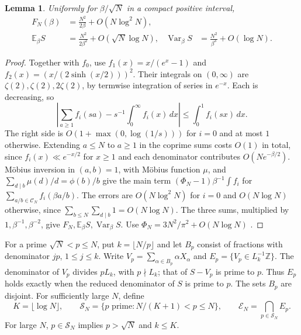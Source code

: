 \documentclass[11pt]{amsart}
\newtheorem{lemma}[theorem]{Lemma}
\theoremstyle{remark}
\DeclareMathOperator{\Var}{Var}
\newcommand{\Ee}{\mathbb E}
\newcommand{\Z}{\mathbb Z}
\newcommand{\CN}{\mathcal C_N}
\begin{document}
\begin{lemma}\label{lem:bulk}
Uniformly for \(\beta/\sqrt N\) in a compact positive interval,
\begin{align*}
 F_N(\beta)&=\frac{N^2}{2\beta}+O(N\log^2 N),\\
 \Ee_\beta S&=\frac{N^2}{2\beta^2}+O(\sqrt N\log N),&
 \Var_\beta S&=\frac{N^2}{\beta^3}+O(\log N).
\end{align*}
\end{lemma}
\begin{proof}
Together with \(f_0\), use \(f_1(x)=x/(e^x-1)\) and
\(f_2(x)=(x/(2\sinh(x/2)))^2\). Their integrals on \((0,\infty)\)
are \(\zeta(2),\zeta(2),2\zeta(2)\), by termwise integration of
series in \(e^{-x}\). Each is decreasing, so
\[
 \left|\sum_{a\ge1} f_i(sa)-s^{-1}\int_0^\infty f_i(x)\,dx\right|
 \le\int_0^1 f_i(sx)\,dx .
\]
The right side is \(O(1+\max(0,\log(1/s)))\) for \(i=0\) and at most
\(1\) otherwise. Extending \(a\le N\) to \(a\ge1\) in the coprime
sums costs \(O(1)\) in total, since \(f_i(x)\ll e^{-x/2}\) for \(x\ge1\)
and each denominator contributes \(O(N e^{-\beta/2})\).
M\"obius inversion in \((a,b)=1\), with M\"obius function \(\mu\), and
\(\sum_{d\mid b}\mu(d)/d=\phi(b)/b\) give the main term
\((\Phi_N-1)\beta^{-1}\int f_i\) for \(\sum_{a/b\in\CN}f_i(\beta a/b)\).
The errors are \(O(N\log^2 N)\) for \(i=0\) and \(O(N\log N)\) otherwise,
since \(\sum_{b\le N}\sum_{d\mid b}1=O(N\log N)\).
The three sums, multiplied by \(1,\beta^{-1},\beta^{-2}\), give
\(F_N,\Ee_\beta S,\Var_\beta S\). Use
\(\Phi_N=3N^2/\pi^2+O(N\log N)\) \cite{hardy-wright}.
\end{proof}

For a prime \(\sqrt N<p\le N\), put \(k=\lfloor N/p\rfloor\) and let
\(B_p\) consist of fractions with denominator \(jp\), \(1\le j\le k\).
Write \(V_p=\sum_{\alpha\in B_p}\alpha X_\alpha\) and
\(E_p=\{V_p\in L_k^{-1}\Z\}\). The denominator of \(V_p\) divides \(pL_k\), with \(p\nmid L_k\);
that of \(S-V_p\) is prime to \(p\). Thus \(E_p\) holds exactly when
the reduced denominator of \(S\) is prime to \(p\).
The sets \(B_p\) are disjoint. For sufficiently large \(N\), define
\begin{equation}\label{eq:cutoff}
 K=\lfloor\log N\rfloor,\qquad
 \mathcal S_N=\{p\text{ prime}:N/(K+1)<p\le N\},\qquad
 \mathcal E_N=\bigcap_{p\in\mathcal S_N}E_p .
\end{equation}
For large \(N\), \(p\in\mathcal S_N\) implies \(p>\sqrt N\) and \(k\le K\).
\end{document}
